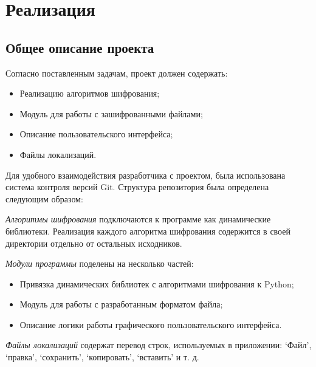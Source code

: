 \newpage
\section{Реализация}\label{sec:razd3}


\subsection{Общее описание проекта} %

Согласно поставленным задачам, проект должен содержать:
\begin{itemize}
  \item Реализацию алгоритмов шифрования;
  \item Модуль для работы с зашифрованными файлами;
  \item Описание пользовательского интерфейса;
  \item Файлы локализаций.
\end{itemize}

Для удобного взаимодействия разработчика с проектом,
была использована система контроля версий Git.
Структура репозитория была определена следующим образом:



\emph{Алгоритмы шифрования} подключаются к программе как динамические
библиотеки. Реализация каждого алгоритма шифрования содержится в своей
директории отдельно от остальных исходников.

\emph{Модули программы} поделены на несколько частей:
\begin{itemize}
    \item Привязка динамических библиотек с алгоритмами шифрования к Python;
    \item Модуль для работы с разработанным форматом файла;
    \item Описание логики работы графического пользовательского интерфейса.
\end{itemize}

\emph{Файлы локализаций} содержат перевод строк, используемых в приложении:
`Файл', `правка', `сохранить', `копировать', `вставить' и т. д.

